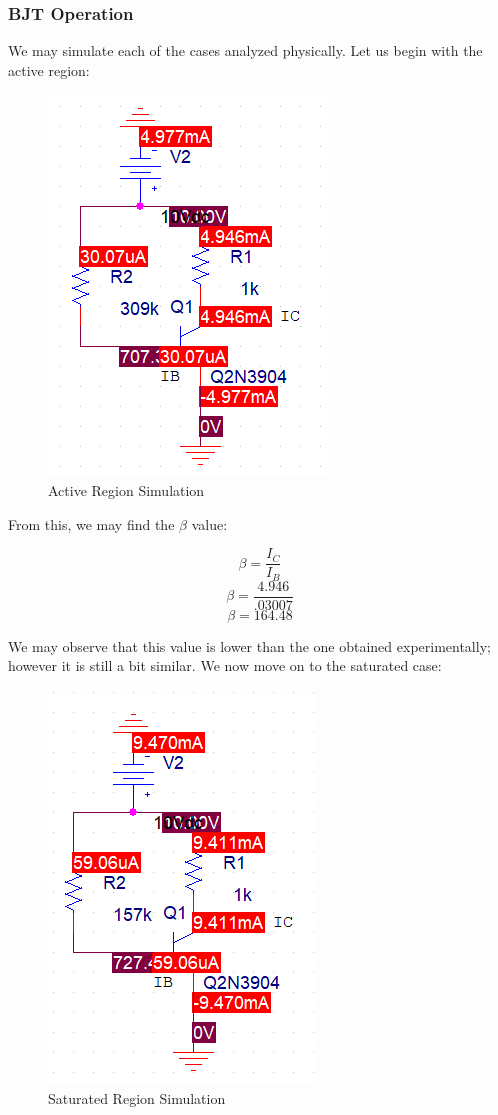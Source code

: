 \documentclass[
	letterpaper, %
	10pt, %
]{CSUniSchoolLabReport}
\begin{document}
\subsubsection{BJT Operation}

We may simulate each of the cases analyzed physically. Let us begin with the active region:

\begin{figure}[H]
  \centering
  \includegraphics[width=.5\textwidth]{Figures/L3F3}
  \caption{Active Region Simulation}
  \label{fig:7}
\end{figure}

From this, we may find the $\beta$ value:

$$\beta=\frac{I_C}{I_B}$$
$$\beta=\frac{4.946}{.03007}$$
$$\boxed{\beta=164.48}$$

We may observe that this value is lower than the one obtained experimentally; however it is still a bit similar. We now move on to the saturated case:

\begin{figure}[H]
  \centering
  \includegraphics[width=.5\textwidth]{Figures/L3F4}
  \caption{Saturated Region Simulation}
  \label{fig:8}
\end{figure}
\end{document}
